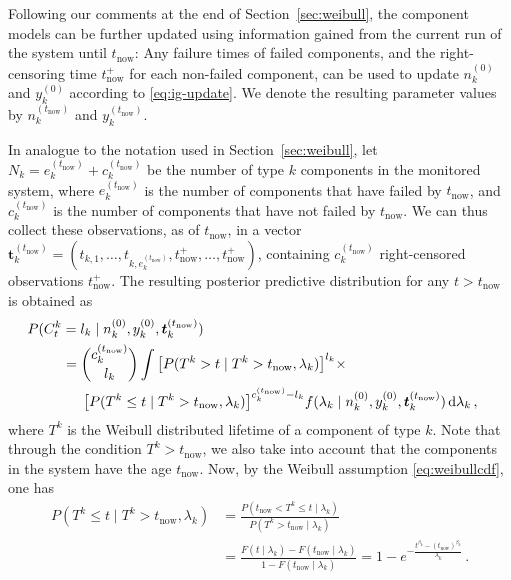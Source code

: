 \documentclass[authoryear]{elsarticle}
\newcommand{\dd}{\,\mathrm{d}}
\renewcommand{\vec}[1]{{\bm#1}}
\newcommand{\uz}{^{(0)}} %
\def\ykz{y\uz_k}
\def\nkz{n\uz_k}
\def\yknow{y_k^{(\tnow)}}
\def\nknow{n_k^{(\tnow)}}
\def\tnow{t_\text{now}}
\def\tpnow{t^+_\text{now}}
\def\eknow{e_k^{(\tnow)}}
\def\cknow{c_k^{(\tnow)}}
\def\vectknow{\vec{t}_k^{(\tnow)}}
\begin{document}
Following our comments at the end of Section~\ref{sec:weibull},
the component models can be further updated
using information gained from the current run of the system until $\tnow$:
Any failure times of failed components,
and the right-censoring time $\tpnow$ for each non-failed component,
can be used to update $\nkz$ and $\ykz$ according to \eqref{eq:ig-update}.
We denote the resulting parameter values by $\nknow$ and $\yknow$.

In analogue to the notation used in Section~\ref{sec:weibull},
let $N_k = \eknow + \cknow$ be the number of type $k$ components in the monitored system,
where $\eknow$ is the number of components that have failed by $\tnow$,
and $\cknow$ is the number of components that have not failed by $\tnow$.
We can thus collect these observations, as of $\tnow$, in a vector
$\vectknow = (t_{k,1}, \ldots, t_{k,\eknow}, \tpnow, \ldots, \tpnow)$,
containing $\cknow$ right-censored observations $\tpnow$.
%
The resulting posterior predictive distribution for any $t > \tnow$ is obtained as
\begin{align}
\lefteqn{%
P(C^k_t = l_k\mid\nkz,\ykz, \vectknow) }\hspace*{5.75ex} \nonumber\\  %
 &= { \cknow \choose l_k} \int \big[P(T^k >    t \mid T^k > \tnow, \lambda_k)\big]^{l_k} \times \nonumber\\ & \hspace*{3.5ex}
                               \big[P(T^k \leq t \mid T^k > \tnow, \lambda_k)\big]^{\cknow - l_k}
    f(\lambda_k\mid\nkz,\ykz,\vectknow) \dd \lambda_k\,,
\label{eq:postpredtnow}
\end{align}
where $T^k$ is the Weibull distributed lifetime of a component of type $k$.
Note that through the condition $T^k > \tnow$, we also take into account
that the components in the system have the age $\tnow$.
Now, by the Weibull assumption \eqref{eq:weibullcdf}, one has
\begin{align}
P(T^k \leq t \mid T^k > \tnow, \lambda_k)
 &= \frac{P(\tnow < T^k \leq t \mid\lambda_k)}{P(T^k > \tnow \mid \lambda_k)} \nonumber\\
 &= \frac{F(t\mid\lambda_k) - F(\tnow\mid\lambda_k)}{1-F(\tnow\mid\lambda_k)} 
  = 1 - e^{-\frac{t^{\beta_k} - (\tnow)^{\beta_k}}{\lambda_k}}\,.
\label{eq:weibullcondprob}
\end{align}
\end{document}

